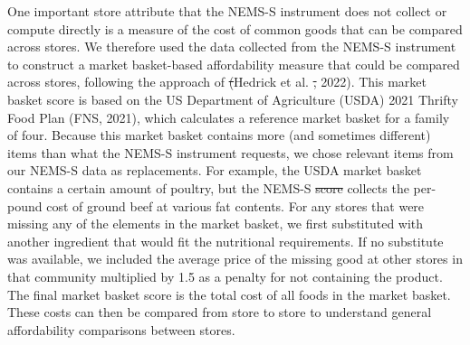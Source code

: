 \documentclass[
  letterpaper,
  number,
  review,
  3p]{elsarticle}
\makeatletter
\providecommand{\DIFadd}[1]{{\protect\color{blue}\uwave{#1}}} %
\providecommand{\DIFdel}[1]{{\protect\color{red}\sout{#1}}} %
\providecommand{\DIFaddbegin}{} %
\providecommand{\DIFaddend}{} %
\providecommand{\DIFdelbegin}{} %
\providecommand{\DIFdelend}{} %
\newcommand{\DIFscaledelfig}{0.5}
\newlength{\DIFdelgraphicswidth} %
\newlength{\DIFdelgraphicsheight} %
\newcommand{\DIFaddincludegraphics}[2][]{{\color{blue}\fbox{\DIFOincludegraphics[#1]{#2}}}} %
\newcommand{\DIFdelincludegraphics}[2][]{%
\sbox{\DIFdelgraphicsbox}{\DIFOincludegraphics[#1]{#2}}%
\settoboxwidth{\DIFdelgraphicswidth}{\DIFdelgraphicsbox} %
\settoboxtotalheight{\DIFdelgraphicsheight}{\DIFdelgraphicsbox} %
\scalebox{\DIFscaledelfig}{%
\parbox[b]{\DIFdelgraphicswidth}{\usebox{\DIFdelgraphicsbox}\\[-\baselineskip] \rule{\DIFdelgraphicswidth}{0em}}\llap{\resizebox{\DIFdelgraphicswidth}{\DIFdelgraphicsheight}{%
\setlength{\unitlength}{\DIFdelgraphicswidth}%
\begin{picture}(1,1)%
\thicklines\linethickness{2pt} %
{\color[rgb]{1,0,0}\put(0,0){\framebox(1,1){}}}%
{\color[rgb]{1,0,0}\put(0,0){\line( 1,1){1}}}%
{\color[rgb]{1,0,0}\put(0,1){\line(1,-1){1}}}%
\end{picture}%
}\hspace*{3pt}}} %
} %
\DeclareRobustCommand{\DIFaddbegin}{\DIFOaddbegin \let\includegraphics\DIFaddincludegraphics} %
\DeclareRobustCommand{\DIFaddend}{\DIFOaddend \let\includegraphics\DIFOincludegraphics} %
\DeclareRobustCommand{\DIFdelbegin}{\DIFOdelbegin \let\includegraphics\DIFdelincludegraphics} %
\DeclareRobustCommand{\DIFdelend}{\DIFOaddend \let\includegraphics\DIFOincludegraphics} %
\let\sout@orig\sout %
\renewcommand{\sout}[1]{\ifmmode\text{\sout@orig{\ensuremath{#1}}}\else\sout@orig{#1}\fi} %
\makeatother
\begin{document}
One important store attribute that the NEMS-S instrument does not
collect or compute directly is a measure of the cost of common goods
that can be compared across stores. We therefore used the data collected
from the NEMS-S instrument to construct a market basket-based
affordability measure that could be compared across stores, following
the approach of \DIFdelbegin \DIFdel{(}\DIFdelend Hedrick et al. \DIFdelbegin \DIFdel{, }\DIFdelend \DIFaddbegin \DIFadd{(}\DIFaddend 2022). This market basket score is based
on the US Department of Agriculture (USDA) 2021 Thrifty Food Plan (FNS,
2021), which calculates a reference market basket for a family of four.
Because this market basket contains more (and sometimes different) items
than what the NEMS-S instrument requests, we chose relevant items from
our NEMS-S data as replacements. For example, the USDA market basket
contains a certain amount of poultry, but the NEMS-S \DIFdelbegin \DIFdel{score
}\DIFdelend \DIFaddbegin \DIFadd{instrument }\DIFaddend collects
the per-pound cost of ground beef at various fat contents. For any
stores that were missing any of the elements in the market basket, we
first substituted with another ingredient that would fit the nutritional
requirements. If no substitute was available, we included the average
price of the missing good at other stores in that community multiplied
by 1.5 as a penalty for not containing the product. The final market
basket score is the total cost of all foods in the market basket. These
costs can then be compared from store to store to understand general
affordability comparisons between stores.
\end{document}
